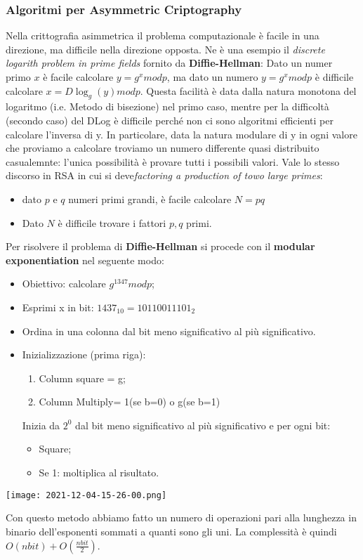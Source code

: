 \documentclass{article}
\theoremstyle{remark}
\begin{document}
\subsubsection{Algoritmi per Asymmetric Criptography}
Nella crittografia asimmetrica il problema computazionale è facile in una direzione, ma difficile nella direzione opposta. Ne è una esempio il \emph{discrete logarith problem in prime fields} fornito da \textbf{Diffie-Hellman}: Dato un numer primo \(x\) è facile calcolare \(y=g^x mod p\), ma dato un numero \(y=g^x mod p\) è difficile calcolare \(x=D\log_{g}(y) mod p\). Questa facilità è data dalla natura monotona del logaritmo (i.e. Metodo di bisezione) nel primo caso, mentre per la difficoltà (secondo caso) del DLog è difficile perché non ci sono algoritmi efficienti per calcolare l'inversa di y. In particolare, data la natura modulare di y in ogni valore che proviamo a calcolare troviamo un numero differente quasi distribuito casualemnte: l'unica possibilità è provare tutti i possibili valori.\newline
Vale lo stesso discorso in RSA in cui si deve\emph{factoring a production of towo large primes}:\begin{itemize}
	\item dato \(p\) e \(q\) numeri primi grandi, è facile calcolare \(N=pq\)
	\item Dato \(N\) è difficile trovare i fattori \(p,q\) primi.
\end{itemize}
Per risolvere il problema di \textbf{Diffie-Hellman} si procede con il \textbf{modular exponentiation} nel seguente modo:\begin{itemize}
	\item Obiettivo: calcolare \(g^{1347}mod p\);
	\item Esprimi x in bit: \(1437_{10}=10110011101_2\)
	\item Ordina in una colonna dal bit meno significativo al più significativo.
	\item Inizializzazione (prima riga):\begin{enumerate}
		      \item Column square = g;
		      \item Column Multiply= 1(se b=0) o g(se b=1)
	      \end{enumerate}
	      Inizia da \(2^0\) dal bit meno significativo al più significativo e per ogni bit:\begin{itemize}
		      \item Square;
		      \item Se 1: moltiplica al risultato.
	      \end{itemize}
\end{itemize}
\begin{center}
	\texttt{[image: 2021-12-04-15-26-00.png]}
\end{center}
Con questo metodo abbiamo fatto un numero di operazioni pari alla lunghezza in binario dell'esponenti sommati a quanti sono gli uni. La complessità è quindi \(O(nbit)+O(\frac{nbit}{2})\).
\end{document}
